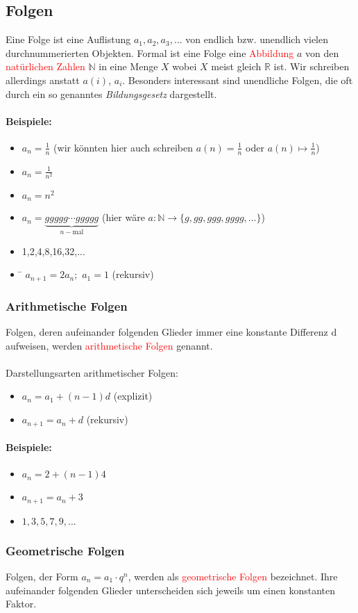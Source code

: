 \subsection{Folgen}
Eine Folge ist eine Auflistung $a_1,a_2,a_3, \ldots$ von endlich bzw. unendlich vielen durchnummerierten Objekten. Formal ist eine Folge eine \textcolor{red}{Abbildung} $a$ von den \textcolor{red}{natürlichen Zahlen} $\mathbb{N}$ in eine Menge $X$ wobei $X$ meist gleich $\mathbb{R}$ ist. Wir schreiben allerdings anstatt $a(i)$, $a_i$. Besonders interessant sind unendliche Folgen, die oft durch ein so genanntes \textit{Bildungsgesetz} dargestellt.

\paragraph{Beispiele:}
\begin{itemize}
\item $a_n = \frac{1}{n}$ (wir könnten hier auch schreiben $a(n) = \frac{1}{n}$ oder $a(n) \mapsto \frac{1}{n}$)
\item $a_n = \frac{1}{n^{2}}$
\item $a_n = n^{2}$
\item $a_n = \underbrace{ggggg \cdots ggggg}_{n-\text{mal}}$ (hier wäre $a: \mathbb{N} \to \{g, gg, ggg, gggg, \ldots\}$)
\item 1,2,4,8,16,32,...
\item \begin{tabbing} 
\hspace{3.5 cm}\=\hspace{5 cm}\kill 
$a_{n+1} = 2a_n;$ \>$a_1 = 1$ (rekursiv)
\end{tabbing}
\end{itemize}

\subsubsection{Arithmetische Folgen}
Folgen, deren aufeinander folgenden Glieder immer eine konstante Differenz d aufweisen, werden \textcolor{red}{arithmetische Folgen} genannt.\\\\
Darstellungsarten arithmetischer Folgen:
\begin{itemize}
\item $a_n = a_1 + (n-1)d$ (explizit)
\item $a_{n+1} = a_n + d$ (rekursiv)
\end{itemize}
\paragraph{Beispiele:}\hspace{12 cm}
\begin{itemize}
\item $a_n = 2 + (n-1)4$
\item $a_{n+1} = a_n + 3$
\item $1,3,5,7,9,...$
\end{itemize}

\subsubsection{Geometrische Folgen}
Folgen, der Form $a_n = a_1 \cdot q^{n}$, werden als \textcolor{red}{geometrische Folgen} bezeichnet.
Ihre aufeinander folgenden Glieder unterscheiden sich jeweils um einen konstanten Faktor.